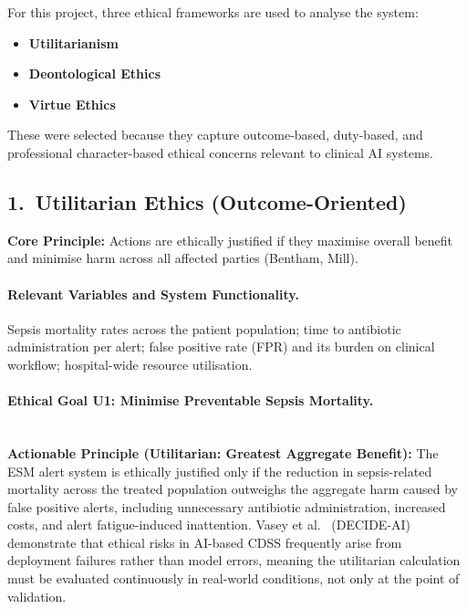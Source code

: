 \documentclass[]{UCD_CS_41820_Report}
\begin{document}
For this project, three ethical frameworks are used to analyse the system:

\begin{itemize}
  \item \textbf{Utilitarianism}
  \item \textbf{Deontological Ethics}
  \item \textbf{Virtue Ethics}
\end{itemize}

These were selected because they capture outcome-based, duty-based, and professional
character-based ethical concerns relevant to clinical AI systems.

\subsection*{1.\ Utilitarian Ethics (Outcome-Oriented)}

\textbf{Core Principle:} Actions are ethically justified if they maximise overall
benefit and minimise harm across all affected parties (Bentham, Mill).

\paragraph{Relevant Variables and System Functionality.}
Sepsis mortality rates across the patient population; time to antibiotic
administration per alert; false positive rate (FPR) and its burden on clinical
workflow; hospital-wide resource utilisation.

\paragraph{Ethical Goal U1: Minimise Preventable Sepsis Mortality.}~\\

\textbf{Actionable Principle (Utilitarian: Greatest Aggregate Benefit):}
The ESM alert system is ethically justified only if the reduction in
sepsis-related mortality across the treated population outweighs the aggregate
harm caused by false positive alerts, including unnecessary antibiotic
administration, increased costs, and alert fatigue-induced inattention. Vasey
et al.\ \cite{vasey2022} (DECIDE-AI) demonstrate that ethical risks in AI-based
CDSS frequently arise from deployment failures rather than model errors, meaning
the utilitarian calculation must be evaluated continuously in real-world conditions,
not only at the point of validation.\par
\end{document}
